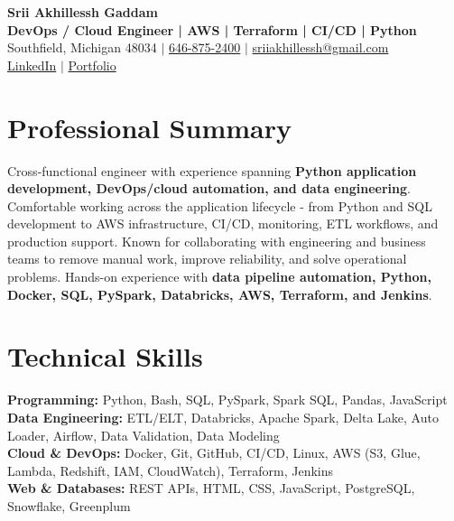 \documentclass[letterpaper,10pt]{article}
\begin{document}
\fontsize{9.35pt}{10.45pt}\selectfont

\begin{center}
    {\LARGE \textbf{Srii Akhillessh Gaddam}} \\[-1pt]
    \textbf{DevOps / Cloud Engineer | AWS | Terraform | CI/CD | Python} \\[2pt]
    Southfield, Michigan 48034 $|$
    \href{tel:6468752400}{646-875-2400} $|$
    \href{mailto:sriiakhillessh@gmail.com}{sriiakhillessh@gmail.com} \\[1pt]
    \href{https://www.linkedin.com/in/srii-akhiilessh-gaddam-b48668191/}{LinkedIn} $|$
    \href{https://sriiakhillesshg.github.io/portfolio/}{Portfolio}
\end{center}
\vspace{-8pt}

\section{Professional Summary}
\small{Cross-functional engineer with experience spanning \textbf{Python application development, DevOps/cloud automation, and data engineering}. Comfortable working across the application lifecycle - from Python and SQL development to AWS infrastructure, CI/CD, monitoring, ETL workflows, and production support. Known for collaborating with engineering and business teams to remove manual work, improve reliability, and solve operational problems. Hands-on experience with \textbf{data pipeline automation, Python, Docker, SQL, PySpark, Databricks, AWS, Terraform, and Jenkins}.}

\section{Technical Skills}
\small{
\textbf{Programming:} Python, Bash, SQL, PySpark, Spark SQL, Pandas, JavaScript \\
\textbf{Data Engineering:} ETL/ELT, Databricks, Apache Spark, Delta Lake, Auto Loader, Airflow, Data Validation, Data Modeling \\
\textbf{Cloud \& DevOps:} Docker, Git, GitHub, CI/CD, Linux, AWS (S3, Glue, Lambda, Redshift, IAM, CloudWatch), Terraform, Jenkins \\
\textbf{Web \& Databases:} REST APIs, HTML, CSS, JavaScript, PostgreSQL, Snowflake, Greenplum
}
\end{document}
